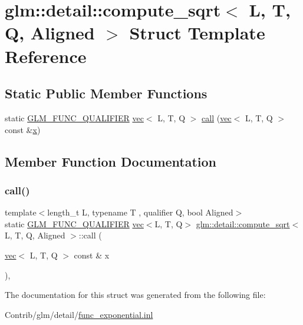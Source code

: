 \hypertarget{structglm_1_1detail_1_1compute__sqrt}{}\section{glm\+:\+:detail\+:\+:compute\+\_\+sqrt$<$ L, T, Q, Aligned $>$ Struct Template Reference}
\label{structglm_1_1detail_1_1compute__sqrt}
\subsection*{Static Public Member Functions}
\begin{DoxyCompactItemize}
\item 
static \mbox{\hyperlink{setup_8hpp_a33fdea6f91c5f834105f7415e2a64407}{G\+L\+M\+\_\+\+F\+U\+N\+C\+\_\+\+Q\+U\+A\+L\+I\+F\+I\+ER}} \mbox{\hyperlink{structglm_1_1vec}{vec}}$<$ L, T, Q $>$ \mbox{\hyperlink{structglm_1_1detail_1_1compute__sqrt_a356d5e5be126cceb0086242ff6c9d905}{call}} (\mbox{\hyperlink{structglm_1_1vec}{vec}}$<$ L, T, Q $>$ const \&\mbox{\hyperlink{_s_d_l__opengl_8h_ad0e63d0edcdbd3d79554076bf309fd47}{x}})
\end{DoxyCompactItemize}


\subsection{Member Function Documentation}
\mbox{\label{structglm_1_1detail_1_1compute__sqrt_a356d5e5be126cceb0086242ff6c9d905}} 
\subsubsection{\texorpdfstring{call()}{call()}}
{\footnotesize\ttfamily template$<$length\+\_\+t L, typename T , qualifier Q, bool Aligned$>$ \\
static \mbox{\hyperlink{setup_8hpp_a33fdea6f91c5f834105f7415e2a64407}{G\+L\+M\+\_\+\+F\+U\+N\+C\+\_\+\+Q\+U\+A\+L\+I\+F\+I\+ER}} \mbox{\hyperlink{structglm_1_1vec}{vec}}$<$L, T, Q$>$ \mbox{\hyperlink{structglm_1_1detail_1_1compute__sqrt}{glm\+::detail\+::compute\+\_\+sqrt}}$<$ L, T, Q, Aligned $>$\+::call (\begin{DoxyParamCaption}\item[{\mbox{\hyperlink{structglm_1_1vec}{vec}}$<$ L, T, Q $>$ const \&}]{x }\end{DoxyParamCaption})\hspace{0.3cm}{\ttfamily [inline]}, {\ttfamily [static]}}



The documentation for this struct was generated from the following file\+:\begin{DoxyCompactItemize}
\item 
Contrib/glm/detail/\mbox{\hyperlink{func__exponential_8inl}{func\+\_\+exponential.\+inl}}\end{DoxyCompactItemize}
